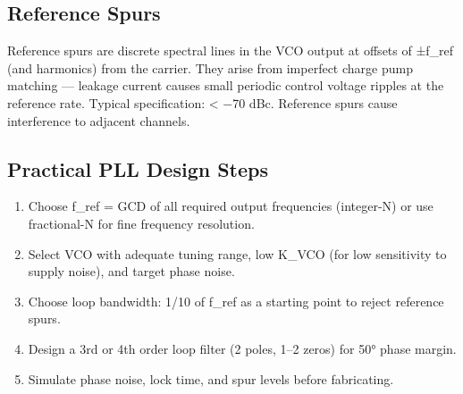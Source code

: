       

\subsection{Reference Spurs}

      

Reference spurs are discrete spectral lines in the VCO output at offsets of ±f\_ref (and harmonics) from the carrier. They arise from imperfect charge pump matching — leakage current causes small periodic control voltage ripples at the reference rate. Typical specification: \textless{} −70 dBc. Reference spurs cause interference to adjacent channels.

      

\subsection{Practical PLL Design Steps}

      
\begin{enumerate}

        \item Choose f\_ref = GCD of all required output frequencies (integer-N) or use fractional-N for fine frequency resolution.

        \item Select VCO with adequate tuning range, low K\_VCO (for low sensitivity to supply noise), and target phase noise.

        \item Choose loop bandwidth: 1/10 of f\_ref as a starting point to reject reference spurs.

        \item Design a 3rd or 4th order loop filter (2 poles, 1–2 zeros) for 50° phase margin.

        \item Simulate phase noise, lock time, and spur levels before fabricating.

      
\end{enumerate}



